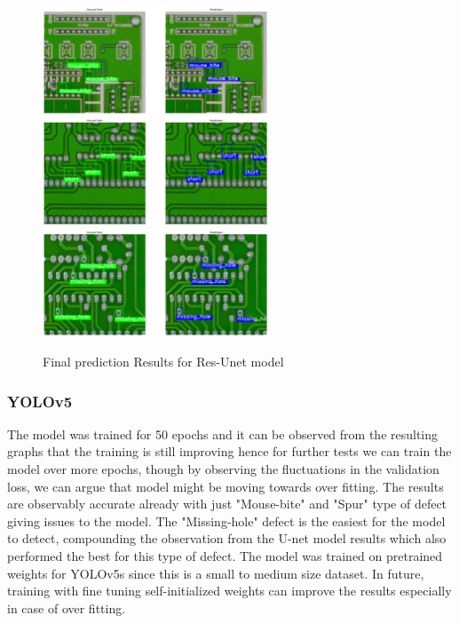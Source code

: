 \documentclass[12pt]{article}
\begin{document}
\begin{figure}[h]
    \centering
    \includegraphics[width=0.6\textwidth]{./graphics/results1_resunet.png}
    \includegraphics[width=0.6\textwidth]{./graphics/results2_resunet.png}
    \includegraphics[width=0.6\textwidth]{./graphics/results3_resunet.png}

    \caption{Final prediction Results for Res-Unet model}
    \label{fig:finalpred1_unet}
\end{figure}

\clearpage
\newpage

\subsubsection{YOLOv5}
The model was trained for 50 epochs and it can be observed from the resulting graphs that the training is still improving hence for further tests we can train the model over more epochs, though by observing the fluctuations in the validation loss, we can argue that model might be moving towards over fitting. The results are observably accurate already with just "Mouse-bite" and "Spur" type of defect giving issues to the model. The "Missing-hole" defect is the easiest for the model to detect, compounding the observation from the U-net model results which also performed the best for this type of defect.
The model was trained on pretrained weights for YOLOv5s since this is a small to medium size dataset. In future, training with fine tuning self-initialized weights can improve the results especially in case of over fitting.
\end{document}
